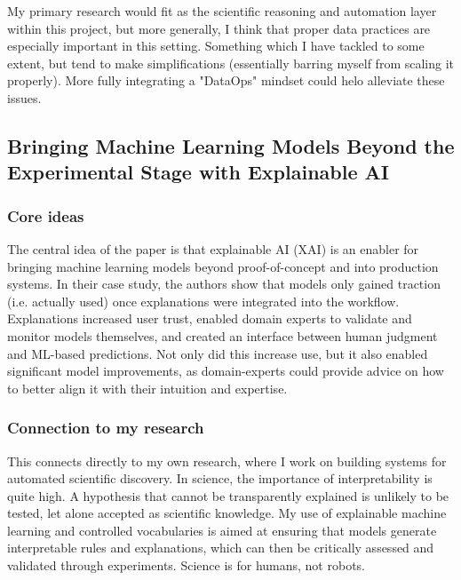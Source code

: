 \documentclass[11pt,compsoc,a4paper]{IEEEtran}
\begin{document}
    My primary research would fit as the scientific reasoning and automation layer within this project, but more generally, I think that proper data practices are especially important in this setting. Something which I have tackled to some extent, but tend to make simplifications (essentially barring myself from scaling it properly). More fully integrating a "DataOps" mindset could helo alleviate these issues.  


\newpage

\subsection*{Bringing Machine Learning Models Beyond the Experimental Stage with Explainable AI}

    \subsubsection*{Core ideas}
    The central idea of the paper \cite{11029994} is that explainable AI (XAI) is an enabler for bringing machine learning models beyond proof-of-concept and into production systems. In their case study, the authors show that models only gained traction (i.e. actually used) once explanations were integrated into the workflow. Explanations increased user trust, enabled domain experts to validate and monitor models themselves, and created an interface between human judgment and ML-based predictions. Not only did this increase use, but it also enabled significant model improvements, as domain-experts could provide advice on how to better align it with their intuition and expertise. 

    \subsubsection*{Connection to my research}
    This connects directly to my own research, where I work on building systems for automated scientific discovery. In science, the importance of interpretability is quite high. A hypothesis that cannot be transparently explained is unlikely to be tested, let alone accepted as scientific knowledge. My use of explainable machine learning and controlled vocabularies is aimed at ensuring that models generate interpretable rules and explanations, which can then be critically assessed and validated through experiments. Science is for humans, not robots.
\end{document}
